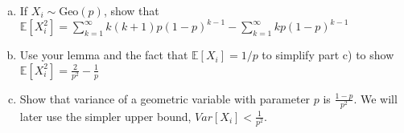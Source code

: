 \documentclass[11pt]{article}
\newif\ifsolutions
\begin{document}
\begin{enumerate}
\begin{enumerate}[a)]
\ifsolutions{\color{blue}{
\vspace{-40mm}
\begin{align*}
\sum\nolimits_{k=0}^{\infty} (1-p)^k &= \frac{1}{p} &\text{take derivative of both sides twice} \\ 
-\sum\nolimits_{k=0}^{\infty} k(1-p)^{k-1} &= -\frac{1}{p^2}  &\text{1st}\\ 
\sum\nolimits_{k=0}^{\infty} k(k-1)(1-p)^{k-2} &= \frac{2}{p^3} &\text{2nd, LHS $k=0$ term is 0}\\ 
\sum\nolimits_{k=1}^{\infty} k(k-1)(1-p)^{k-2} &= \frac{2}{p^3} \\
\sum\nolimits_{j=0}^{\infty} (j+1)j(1-p)^{j-1} &= \frac{2}{p^3} 
&\text{change summation bounds} j = k-1 \\
\sum\nolimits_{j=1}^{\infty} j(j+1)(1-p)^{j-1} &= \frac{2}{p^3} &\text{LHS $j=0$ term is 0}
\end{align*}
}}\fi


\item If $X_i \sim \text{Geo}(p)$, show that $\mathbb{E}[X_i^2] = \sum\nolimits_{k=1}^{\infty} k(k+1)p(1-p)^{k-1} - \sum\nolimits_{k=1}^{\infty} kp(1-p)^{k-1}$

\vspace{25mm}

\ifsolutions{\color{blue}{
\vspace{-25mm}
By definition $\mathbb{E}[X_i^2] = \sum\nolimits_{k=1}^{\infty} k^2p(1-p)^{k-1}$. Since $k^2 = k(k+1) - k$, we can plug that in to get the answer. 
}}\fi


\item Use your lemma and the fact that $\mathbb{E}[X_i] = 1/p$ to simplify part c) to show $\mathbb{E}[X_i^2] = \frac{2}{p^2} - \frac{1}{p} $
\vspace{20mm}

\ifsolutions{\color{blue}{
\vspace{-20mm}
We simply plug in our lemma to the first sum term in part c). We also notice that the second sum term is just the expectation of a geometric variable with parameter $p$. So, we get 
\[ \mathbb{E}[X_i^2] = p\cdot \frac{2}{p^3} - \frac{1}{p} \]
}}\fi


\item Show that variance of a geometric variable with parameter $p$ is
  $\frac{1-p}{p^2}$. We will later use the simpler upper bound, $Var[X_i] < \frac{1}{p^2}$.
\vspace{20mm}

\ifsolutions{\color{blue}{
\vspace{-20mm}
\begin{align*}
Var[X_i] &= \mathbb{E}[X_i^2] - \mathbb{E}[X_i]^2 \\ 
&= \frac{2}{p^2} - \frac{1}{p}  - (\frac{1}{p})^2 \\
&= \frac{1}{p^2} - \frac{1}{p} \\
&= \frac{1-p}{p^2} < \frac{1}{p^2}
\end{align*}
}}\fi



\end{enumerate}
\end{enumerate}
\end{document}
